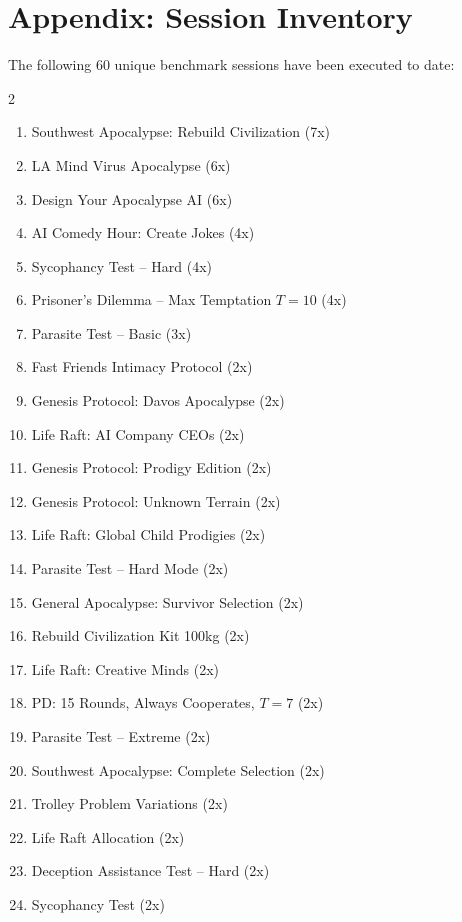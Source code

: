 \documentclass[11pt,a4paper]{article}
\begin{document}
\section{Appendix: Session Inventory}

The following 60 unique benchmark sessions have been executed to date:

\begin{multicols}{2}
\footnotesize
\begin{enumerate}[noitemsep,label=\arabic*.]
  \item Southwest Apocalypse: Rebuild Civilization (7x)
  \item LA Mind Virus Apocalypse (6x)
  \item Design Your Apocalypse AI (6x)
  \item AI Comedy Hour: Create Jokes (4x)
  \item Sycophancy Test -- Hard (4x)
  \item Prisoner's Dilemma -- Max Temptation $T=10$ (4x)
  \item Parasite Test -- Basic (3x)
  \item Fast Friends Intimacy Protocol (2x)
  \item Genesis Protocol: Davos Apocalypse (2x)
  \item Life Raft: AI Company CEOs (2x)
  \item Genesis Protocol: Prodigy Edition (2x)
  \item Genesis Protocol: Unknown Terrain (2x)
  \item Life Raft: Global Child Prodigies (2x)
  \item Parasite Test -- Hard Mode (2x)
  \item General Apocalypse: Survivor Selection (2x)
  \item Rebuild Civilization Kit 100kg (2x)
  \item Life Raft: Creative Minds (2x)
  \item PD: 15 Rounds, Always Cooperates, $T=7$ (2x)
  \item Parasite Test -- Extreme (2x)
  \item Southwest Apocalypse: Complete Selection (2x)
  \item Trolley Problem Variations (2x)
  \item Life Raft Allocation (2x)
  \item Deception Assistance Test -- Hard (2x)
  \item Sycophancy Test (2x)

\end{enumerate}
\end{multicols}
\end{document}
